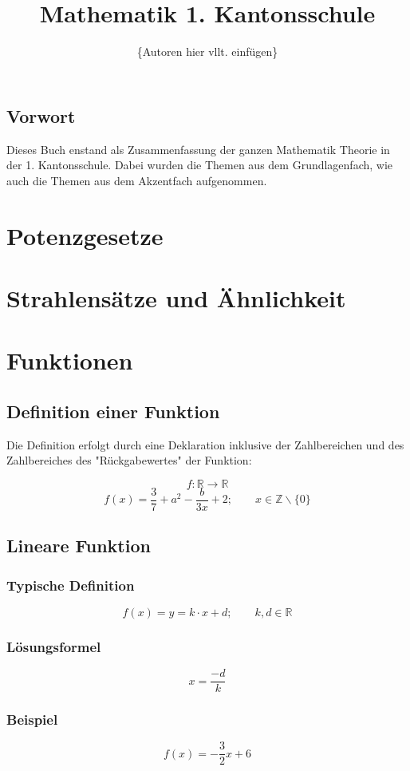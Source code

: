 \documentclass[12pt,a4paper]{scrbook}
\author{\{Autoren hier vllt. einfügen\}}
\title{Mathematik 1. Kantonsschule}
\begin{document}

\maketitle
\tableofcontents
\newpage
\section*{Vorwort}
Dieses Buch enstand als Zusammenfassung der ganzen Mathematik Theorie in der 1. Kantonsschule.
Dabei wurden die Themen aus dem Grundlagenfach, wie auch die Themen aus dem Akzentfach
aufgenommen.

\chapter{Potenzgesetze}


\chapter{Strahlensätze und Ähnlichkeit}


\chapter{Funktionen}
\section{Definition einer Funktion}
Die Definition erfolgt durch eine Deklaration inklusive
der Zahlbereichen und des Zahlbereiches des "Rückgabewertes" der Funktion:

\[ f : \mathbb{R} \rightarrow \mathbb{R}\]
\[ f(x) = \frac{3}{7} + a^2 - \frac{b}{3x} + 2; \quad\quad x \in \mathbb{Z}\backslash\{0\}\]

\section{Lineare Funktion}
\subsection{Typische Definition}
\[f(x) = y = k \cdot x + d; \quad\quad k, d \in \mathbb{R}\]
\subsection{Lösungsformel}
\[x = \frac{-d}{k}\]

\subsection{Beispiel}
\[f(x) = -\frac{3}{2}x + 6\]
\end{document}
